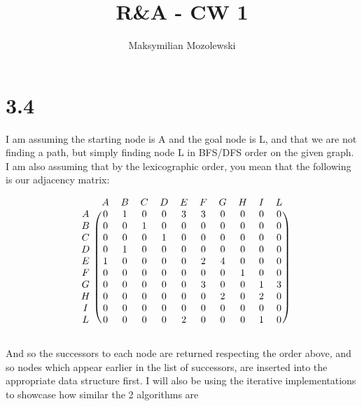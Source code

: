\documentclass{report}
\begin{document}
\title{R\&A - CW 1}
\author{Maksymilian Mozolewski}
\maketitle
\pagebreak

\section*{3.4}
I am assuming the starting node is A and the goal node is L, and that we are not finding a path, but simply finding node L in BFS/DFS order on the given graph. I am also assuming that by the lexicographic order, you mean that the following is our adjacency matrix:
\begin{center}
    \[
    \begin{blockarray}{ccccccccccc}
    & A & B & C & D & E & F & G & H & I & L \\
    \begin{block}{c(cccccccccc)}
     A & 0 & 1 & 0 & 0 & 3 & 3 & 0 & 0 & 0 & 0\\
     B & 0 & 0 & 1 & 0 & 0 & 0 & 0 & 0 & 0 & 0\\
     C & 0 & 0 & 0 & 1 & 0 & 0 & 0 & 0 & 0 & 0\\
     D & 0 & 1 & 0 & 0 & 0 & 0 & 0 & 0 & 0 & 0\\      
     E & 1 & 0 & 0 & 0 & 0 & 2 & 4 & 0 & 0 & 0\\      
     F & 0 & 0 & 0 & 0 & 0 & 0 & 0 & 1 & 0 & 0\\      
     G & 0 & 0 & 0 & 0 & 0 & 3 & 0 & 0 & 1 & 3\\      
     H & 0 & 0 & 0 & 0 & 0 & 0 & 2 & 0 & 2 & 0\\      
     I & 0 & 0 & 0 & 0 & 0 & 0 & 0 & 0 & 0 & 0\\      
     L & 0 & 0 & 0 & 0 & 2 & 0 & 0 & 0 & 1 & 0\\
    \end{block}
    \end{blockarray}
     \]
\end{center}
And so the successors to each node are returned respecting the order above, and so nodes which appear earlier in the list of successors, are inserted into the appropriate data structure first. I will also be using the iterative implementations to showcase how similar the 2 algorithms are
\end{document}
